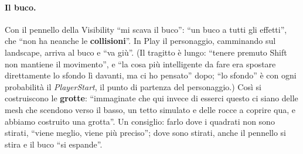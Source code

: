\paragraph{Il buco.} Con il pennello della Visibility ``mi scava il buco'': ``un buco a tutti
gli effetti'', che ``non ha neanche le \textbf{collisioni}''. In Play il personaggio,
camminando sul landscape, arriva al buco e ``va giù''. (Il tragitto è lungo: ``tenere premuto
Shift non mantiene il movimento'', e ``la cosa più intelligente da fare era spostare
direttamente lo sfondo lì davanti, ma ci ho pensato'' dopo; ``lo sfondo'' è con ogni
probabilità il \emph{PlayerStart}, il punto di partenza del personaggio.) Così si costruiscono le
\textbf{grotte}: ``immaginate che qui invece di esserci questo ci siano delle mesh che scendono
verso il basso, un tetto simulato e delle rocce a coprire qua, e abbiamo costruito una
grotta''. Un consiglio: farlo dove i quadrati non sono stirati, ``viene meglio, viene più
preciso''; dove sono stirati, anche il pennello si stira e il buco ``si espande''.

